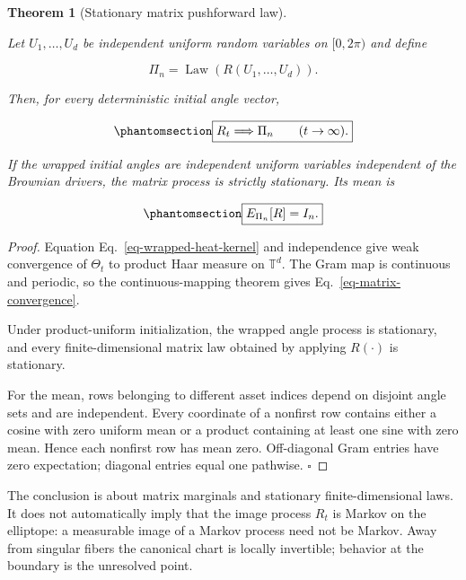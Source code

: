 \documentclass[
  english,
  11pt,
  letterpaper,
  DIV=11,
  numbers=noendperiod]{scrartcl}
\theoremstyle{plain}
\newtheorem{theorem}{Theorem}[section]
\theoremstyle{plain}
\theoremstyle{plain}
\theoremstyle{plain}
\theoremstyle{remark}
\begin{document}
\begin{theorem}[Stationary matrix pushforward
law]\protect\hypertarget{thm-phasegram-stationary}{}\label{thm-phasegram-stationary}

Let \(U_1,\ldots,U_d\) be independent uniform random variables on
\([0,2\pi)\) and define

\[
\Pi_n=\operatorname{Law}(R(U_1,\ldots,U_d)).
\]

Then, for every deterministic initial angle vector,

\begin{equation}\protect\phantomsection\label{eq-matrix-convergence}{
\boxed{
R_t\Longrightarrow\Pi_n
\qquad(t\to\infty).
}
}\end{equation}

If the wrapped initial angles are independent uniform variables
independent of the Brownian drivers, the matrix process is strictly
stationary. Its mean is

\begin{equation}\protect\phantomsection\label{eq-stationary-mean}{
\boxed{
E_{\Pi_n}[R]=I_n.
}
}\end{equation}

\end{theorem}

\begin{proof}
Equation Eq.~\ref{eq-wrapped-heat-kernel} and independence give weak
convergence of \(\Theta_t\) to product Haar measure on \(\mathbb T^d\).
The Gram map is continuous and periodic, so the continuous-mapping
theorem gives Eq.~\ref{eq-matrix-convergence}.

Under product-uniform initialization, the wrapped angle process is
stationary, and every finite-dimensional matrix law obtained by applying
\(R(\cdot)\) is stationary.

For the mean, rows belonging to different asset indices depend on
disjoint angle sets and are independent. Every coordinate of a nonfirst
row contains either a cosine with zero uniform mean or a product
containing at least one sine with zero mean. Hence each nonfirst row has
mean zero. Off-diagonal Gram entries have zero expectation; diagonal
entries equal one pathwise. \(\square\)
\end{proof}

The conclusion is about matrix marginals and stationary
finite-dimensional laws. It does not automatically imply that the image
process \(R_t\) is Markov on the elliptope: a measurable image of a
Markov process need not be Markov. Away from singular fibers the
canonical chart is locally invertible; behavior at the boundary is the
unresolved point.
\end{document}
